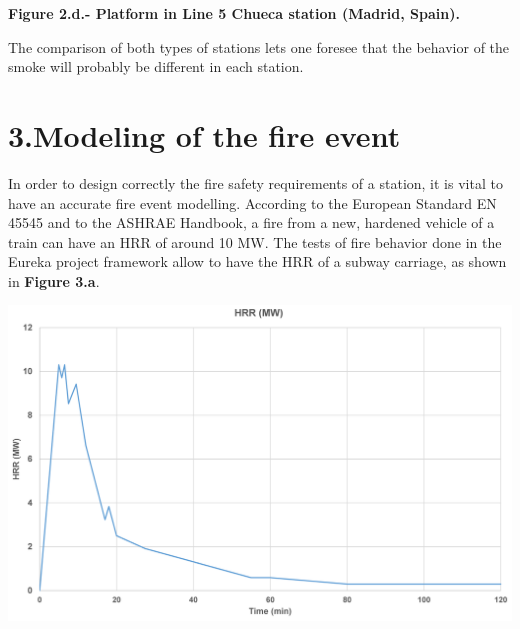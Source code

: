 \documentclass{article}
\begin{document}
\begin{mdcenter}%

\noindent{}\textbf{Figure 2.d.- Platform in Line 5 Chueca station (Madrid, Spain).}%
\end{mdcenter}%

\noindent{}The comparison of both types of stations lets one foresee that the behavior of the 
smoke will probably be different in each station.%

\section{3.\hspace*{0.5em}Modeling of the fire event}\label{sec-modeling-of-the-fire-event}%

\noindent{}In order to design correctly the fire safety requirements of a station, it is vital 
to have an accurate fire event modelling. According to the European Standard EN 45545 
and to the ASHRAE Handbook, a fire from a new, hardened vehicle of a train can have 
an HRR of around 10 MW. The tests of fire behavior done in the Eureka project 
framework allow to have the HRR of a subway carriage, as shown in \textbf{Figure 3.a}.%

\begin{mdcenter}%

\noindent{}\includegraphics[keepaspectratio=true,width=\dimmin{}{\dimwidth{0.45}}]{images/Fig-3.a}{}%
\end{mdcenter}%
\end{document}
